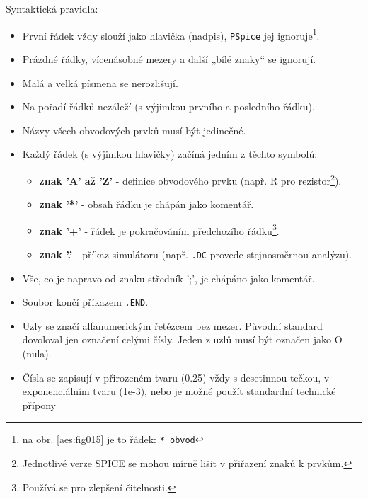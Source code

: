       \begin{mdframed}[style=mdnote]
        \begin{note}
          Syntaktická pravidla:
          \begin{itemize}[noitemsep]
            \item První řádek vždy slouží jako hlavička (nadpis),
                  \texttt{PSpice} jej ignoruje\footnote{na obr. \ref{aes:fig015} je to
                  řádek: \texttt{* obvod}}. 
            \item Prázdné řádky, vícenásobné mezery a další „bílé znaky“ se ignorují. 
            \item Malá a velká písmena se nerozlišují. 
            \item Na pořadí řádků nezáleží (s výjimkou prvního a posledního řádku). 
            \item Názvy všech obvodových prvků musí být jedinečné. 
            \item Každý řádek (s výjimkou hlavičky) začíná jedním z těchto symbolů: 
                  \begin{itemize}[noitemsep]
                    \item \textbf{znak 'A' až 'Z'} - definice obvodového prvku (např. R pro
                          rezistor\footnote{Jednotlivé verze SPICE se mohou mírně lišit v přiřazení
                          znaků k prvkům.}).
                    \item \textbf{znak '*'} - obsah řádku je chápán jako komentář. 
                    \item \textbf{znak '+'} - řádek je pokračováním předchozího
                          řádku\footnote{Používá se pro zlepšení čitelnosti.}. 
                    \item \textbf{znak '.'} - příkaz simulátoru (např. \texttt{.DC} provede
                          stejnosměrnou analýzu).
                  \end{itemize}
            \item Vše, co je napravo od znaku středník ';', je chápáno jako komentář.
            \item Soubor končí příkazem \texttt{.END}. 
            \item Uzly se značí alfanumerickým řetězcem bez mezer. Původní standard dovoloval jen
                  označení celými čísly. Jeden z uzlů musí být označen jako O (nula).
            \item Čísla se zapisují v přirozeném tvaru (\num{0.25}) vždy s desetinnou tečkou, v
                  exponenciálním tvaru (1e-3), nebo je možné použít standardní technické přípony

\end{itemize}
\end{note}
\end{mdframed}

